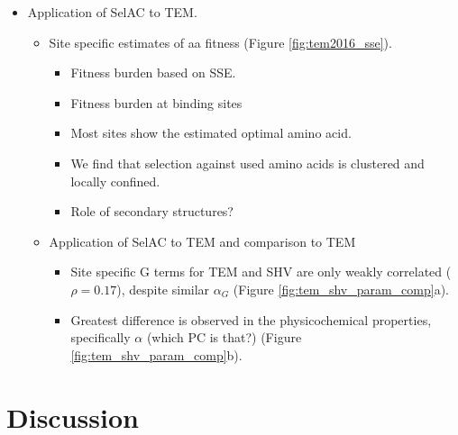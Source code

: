 \documentclass[12pt]{article}
\begin{document}
\begin{itemize}
	\item Application of SelAC to TEM.
	\begin{itemize}
		\item Site specific estimates of aa fitness (Figure \ref{fig:tem2016_sse}).
		\begin{itemize}
			\item Fitness burden based on SSE.
			\item Fitness burden at binding sites
			\item Most sites show the estimated optimal amino acid.
			\item We find that selection against used amino acids is clustered and locally confined.
			\item Role of secondary structures?
		\end{itemize}
		\item Application of SelAC to TEM and comparison to TEM
		\begin{itemize}
			\item Site specific G terms for TEM and SHV are only weakly correlated ($\rho = 0.17$), despite similar $\alpha_G$ (Figure \ref{fig:tem_shv_param_comp}a).
			\item Greatest difference is observed in the physicochemical properties, specifically $\alpha$ (which PC is that?) (Figure \ref{fig:tem_shv_param_comp}b).
		\end{itemize}
	\end{itemize}
\end{itemize}

\section*{Discussion}
\end{document}
